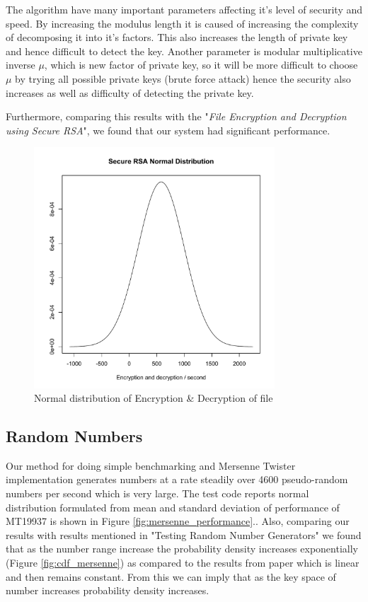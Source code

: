 \documentclass[12pt,journal,compsoc]{IEEEtran}
\begin{document}
The algorithm have many important parameters affecting it's level of security and speed. By increasing the modulus length it is caused of increasing the complexity of decomposing it into it's factors. This also increases the length of private key and hence difficult to detect the key. Another parameter is modular multiplicative inverse $\mu$, which is new factor of private key, so it will be more difficult to choose $\mu$ by trying all possible private keys (brute force attack) hence the security also increases as well as difficulty of detecting the private key.


Furthermore, comparing this results with the "\emph{File Encryption and Decryption using Secure RSA}"\cite{securersa}, we found that our system had significant performance.


\begin{figure}[ht!]
\centering
\includegraphics[width=90mm]{images/rsaPlot.pdf}
\caption{Normal distribution of Encryption \& Decryption of file}
\label{fig:rsa_cdf}
\end{figure}

\subsection{{Random Numbers}}
Our method for doing simple benchmarking and Mersenne Twister implementation generates numbers at a rate steadily over 4600 pseudo-random numbers per second which is very large. The test code reports normal distribution formulated from mean and standard deviation of performance of MT19937 is shown in Figure \ref{fig:mersenne_performance}.\cite{wolfram_mt}. Also, comparing our results with results mentioned in "Testing Random Number Generators"\cite{lcg_cdf} we found that as the number range increase the probability density increases exponentially (Figure \ref{fig:cdf_mersenne}) as compared to the results from paper\cite{lcg_cdf} which is linear and then remains constant. From this we can imply that as the key space of number increases probability density increases.
\end{document}
